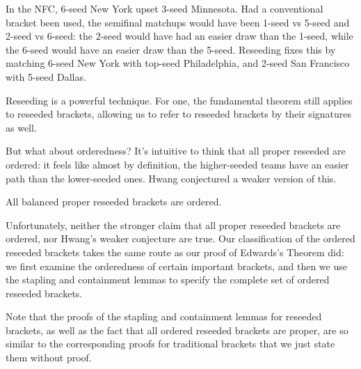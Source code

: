 {

In the NFC, 6-seed New York upset 3-seed Minnesota. Had a conventional bracket been used, the semifinal matchups would have been 1-seed vs 5-seed and 2-seed vs 6-seed: the 2-seed would have had an easier draw than the 1-seed, while the 6-seed would have an easier draw than the 5-seed. Reseeding fixes this by matching 6-seed New York with top-seed Philadelphia, and 2-seed San Francisco with 5-seed Dallas.

Reseeding is a powerful technique. For one, the fundamental theorem still applies to reseeded brackets, allowing us to refer to reseeded brackets by their signatures as well.


But what about orderedness? It's intuitive to think that all proper reseeded are ordered: it feels like almost by definition, the higher-seeded teams have an easier path than the lower-seeded ones. Hwang \cite{reseeding} conjectured a weaker version of this.

\begin{conj}{}{}
    All balanced proper reseeded brackets are ordered.
\end{conj}

Unfortunately, neither the stronger claim that all proper reseeded brackets are ordered, nor Hwang's weaker conjecture are true. Our classification of the ordered reseeded brackets takes the same route as our proof of Edwards's Theorem did: we first examine the orderedness of certain important brackets, and then we use the stapling and containment lemmas to specify the complete set of ordered reseeded brackets.

Note that the proofs of the stapling and containment lemmas for reseeded brackets, as well as the fact that all ordered reseeded brackets are proper, are so similar to the corresponding proofs for traditional brackets that we just state them without proof. 

}
